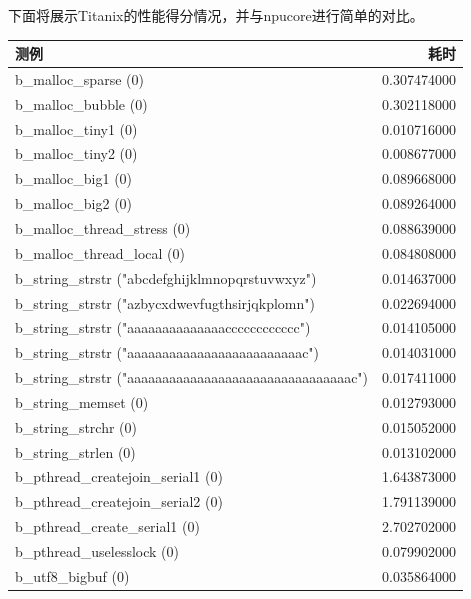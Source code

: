 下面将展示Titanix的性能得分情况，并与npucore进行简单的对比。

\begin{table}[H]
    \centering
    \begin{tabular}{|l|r|}
        \hline
        测例 & 耗时 \\
        \hline
        b\_malloc\_sparse (0) & 0.307474000 \\
        \hline
        b\_malloc\_bubble (0) & 0.302118000 \\
        \hline
        b\_malloc\_tiny1 (0) & 0.010716000 \\
        \hline
        b\_malloc\_tiny2 (0) & 0.008677000 \\
        \hline
        b\_malloc\_big1 (0) & 0.089668000 \\
        \hline
        b\_malloc\_big2 (0) & 0.089264000 \\
        \hline
        b\_malloc\_thread\_stress (0) & 0.088639000 \\
        \hline
        b\_malloc\_thread\_local (0) & 0.084808000 \\
        \hline
        b\_string\_strstr ("abcdefghijklmnopqrstuvwxyz") & 0.014637000 \\
        \hline
        b\_string\_strstr ("azbycxdwevfugthsirjqkplomn") & 0.022694000 \\
        \hline
        b\_string\_strstr ("aaaaaaaaaaaaaacccccccccccc") & 0.014105000 \\
        \hline
        b\_string\_strstr ("aaaaaaaaaaaaaaaaaaaaaaaaac") & 0.014031000 \\
        \hline
        b\_string\_strstr ("aaaaaaaaaaaaaaaaaaaaaaaaaaaaaaaac") & 0.017411000 \\
        \hline
        b\_string\_memset (0) & 0.012793000 \\
        \hline
        b\_string\_strchr (0) & 0.015052000 \\
        \hline
        b\_string\_strlen (0) & 0.013102000 \\
        \hline
        b\_pthread\_createjoin\_serial1 (0) & 1.643873000 \\
        \hline
        b\_pthread\_createjoin\_serial2 (0) & 1.791139000 \\
        \hline
        b\_pthread\_create\_serial1 (0) & 2.702702000 \\
        \hline
        b\_pthread\_uselesslock (0) & 0.079902000 \\
        \hline
        b\_utf8\_bigbuf (0) & 0.035864000 \\

\end{tabular}
\end{table}
